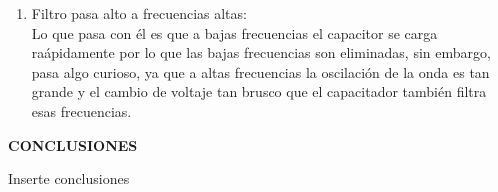 \documentclass[12pt]{article}
\begin{document}
\begin{enumerate}
\begin{itemize}
			
		\end{itemize}
	
		\item Filtro pasa alto a frecuencias altas:\\
		
		\noindent Lo que pasa con él es que a bajas frecuencias el capacitor se carga raápidamente por lo que las bajas frecuencias son eliminadas, sin embargo, pasa algo curioso, ya que a altas frecuencias la oscilación de la onda es tan grande y el cambio de voltaje tan brusco que el capacitador también filtra esas frecuencias.\\
		
	\end{enumerate}
	
	\newpage
	
	\begin{center}
		\textbf{\large CONCLUSIONES}\\
	\end{center}
	
	Inserte conclusiones
	
	\newpage
	
\end{document}
